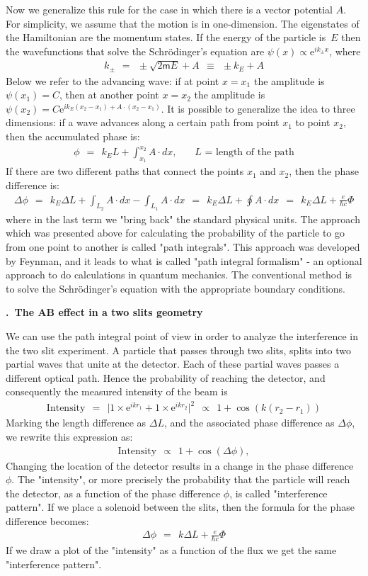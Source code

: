 \documentclass[onecolumn,fleqn, 11pt]{revtex4}
\newcommand{\eexp}{\mathrm{e}^}
\newcommand{\mass}{\mathsf{m}}
\newcommand{\beq}{\begin{eqnarray}}
\newcommand{\eeq}{\end{eqnarray}}
\renewcommand{\thesubsection}{\arabic{subsection}}
\renewcommand{\thesubsubsection}{\arabic{subsubsection}}
\newcommand{\sheadC}[1]
{
\addtocounter{subsubsection}{1}
\vspace{5mm}
{\bf \thesubsection.\thesubsubsection \ #1}  
\nopagebreak
\phantomsection
}
\begin{document}
Now we generalize this rule for the case in which 
there is a vector potential $A$. 
For simplicity, we assume that the motion 
is in one-dimension. The eigenstates of the Hamiltonian are 
the momentum states. 
If the energy of the particle is~$E$ then the wavefunctions   
that solve the Schr\"{o}dinger's equation 
are ${\psi (x) \propto \eexp{ik_{\pm} x}}$, where  
\beq
k_{\pm} \ \ = \ \  \pm \sqrt {2\mass E } + A \ \  \equiv \ \  \pm k_E + A 
\eeq
Below we refer to the advancing wave:  
if at point ${x=x_1}$ the amplitude is ${\psi (x_1)=C}$, 
then at another point ${x=x_2}$ the amplitude 
is ${\psi (x_2)= C \eexp{ ik_E(x_2-x_1) + A \cdot (x_2-x_1) }}$. 
It is possible to generalize the idea to three 
dimensions: if a wave advances along a certain path 
from point $x_1$ to point $x_2$, then the accumulated phase is:
\beq
\phi \ \ = \ \  k_E L + \int_{x_1}^{x_2} A \cdot dx, 
\ \ \ \ \ \ \ \ \mbox{$L$ = length of the path}  
\eeq
If there are two different paths that connect 
the points ${x_1}$ and ${x_2}$, then the phase difference is:
\beq
\Delta \phi  \ \ = \ \ k_E \Delta L + \int_{L_2} A \cdot dx - \int_{L_1} A \cdot dx  
\ \ = \ \ k_E \Delta L + \oint A \cdot dx 
\ \ = \ \ k_E \Delta L + \frac{e}{\hbar c}\Phi 
\eeq
where in the last term we "bring back" the standard physical units. 
The approach which was presented above for calculating 
the probability of the particle to go from one point 
to another is called "path integrals". This approach 
was developed by Feynman, and it leads to what is 
called "path integral formalism" - an optional approach 
to do calculations in quantum mechanics. The conventional method 
is to solve the Schr\"{o}dinger's equation with the 
appropriate boundary conditions. 



\sheadC{The AB effect in a two slits geometry} 

We can use the path integral point of view 
in order to analyze the interference 
in the two slit experiment. A particle  
that passes through two slits, splits into two partial waves 
that unite at the detector. 
Each of these partial waves passes a different optical path.
Hence the probability of reaching the detector, 
and consequently the measured intensity of the beam is 
\beq
\mbox{Intensity} 
\ \ = \ \ \Big|1\times \eexp{ ikr_1} + 1\times \eexp{ikr_2}\Big|^2 
\ \ \propto \ \ 1+\cos(k(r_2-r_1)) 
\eeq
Marking the length difference as $\Delta L$, 
and the associated phase difference as ${\Delta\phi}$, 
we rewrite this expression as:
\beq
\mbox{Intensity} \ \ \propto \ \ 1 + \cos(\Delta\phi), 
\eeq
Changing the location of the detector results in a change in the phase difference ${\phi}$. 
The "intensity", or more precisely the probability that the particle will reach the detector, 
as a function of the phase difference ${\phi}$, is called "interference pattern". 
If we place a solenoid between the slits, then the formula for the phase difference becomes:
\beq
\Delta\phi \ \ = \ \ k \Delta L + \frac{e}{\hbar c}\Phi 
\eeq
If we draw a plot of the "intensity" as a function 
of the flux we get the same "interference pattern".
\end{document}
